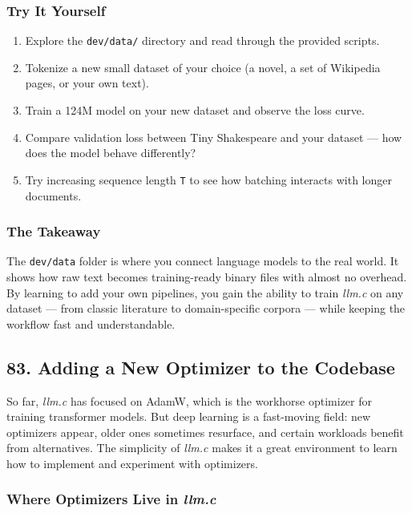 \documentclass[
  letterpaper,
  DIV=11,
  numbers=noendperiod]{scrreprt}
\providecommand{\tightlist}{%
  \setlength{\itemsep}{0pt}\setlength{\parskip}{0pt}}
\begin{document}
\subsubsection{Try It Yourself}\label{try-it-yourself-70}

\begin{enumerate}
\def\labelenumi{\arabic{enumi}.}
\tightlist
\item
  Explore the \texttt{dev/data/} directory and read through the provided
  scripts.
\item
  Tokenize a new small dataset of your choice (a novel, a set of
  Wikipedia pages, or your own text).
\item
  Train a 124M model on your new dataset and observe the loss curve.
\item
  Compare validation loss between Tiny Shakespeare and your dataset ---
  how does the model behave differently?
\item
  Try increasing sequence length \texttt{T} to see how batching
  interacts with longer documents.
\end{enumerate}

\subsubsection{The Takeaway}\label{the-takeaway-71}

The \texttt{dev/data} folder is where you connect language models to the
real world. It shows how raw text becomes training-ready binary files
with almost no overhead. By learning to add your own pipelines, you gain
the ability to train \emph{llm.c} on any dataset --- from classic
literature to domain-specific corpora --- while keeping the workflow
fast and understandable.

\subsection{83. Adding a New Optimizer to the
Codebase}\label{adding-a-new-optimizer-to-the-codebase}

So far, \emph{llm.c} has focused on AdamW, which is the workhorse
optimizer for training transformer models. But deep learning is a
fast-moving field: new optimizers appear, older ones sometimes
resurface, and certain workloads benefit from alternatives. The
simplicity of \emph{llm.c} makes it a great environment to learn how to
implement and experiment with optimizers.

\subsubsection{\texorpdfstring{Where Optimizers Live in
\emph{llm.c}}{Where Optimizers Live in llm.c}}\label{where-optimizers-live-in-llm.c}
\end{document}
